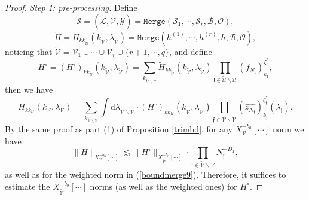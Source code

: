 \documentclass[11 pt,reqno]{amsart}
\theoremstyle{definition}
\theoremstyle{remark}
\numberwithin{equation}{section}
\newcommand{\Sc}{\mathcal{S}}
\newcommand{\Lc}{\mathcal{L}}
\newcommand{\Uc}{\mathcal{U}}
\newcommand{\Vc}{\mathcal{V}}
\newcommand{\Yc}{\mathcal{Y}}
\newcommand{\ff}{\mathfrak{f}}
\newcommand{\lf}{\mathfrak{l}}
\newcommand{\Bs}{\mathscr{B}}
\newcommand{\Os}{\mathscr{O}}
\begin{document}
{\begin{proof}
\emph{Step 1: pre-processing.} Define \[\widetilde{\Sc}=(\widetilde{\Lc},\widetilde{\Vc},\widetilde{\Yc})=\mathtt{Merge}(\Sc_1,\cdots,\Sc_r,\Bs,\Os),\]\[\widetilde{H}=\widetilde{H}_{kk_{\widetilde{\Uc}}}(k_{\widetilde{\Vc}},\lambda_{\widetilde{\Vc}})=\mathtt{Merge}(h^{(1)},\cdots, h^{(r)},h,\Bs,\Os),\] noticing that $\widetilde{\Vc}=\Vc_1\cup\cdots\cup\Vc_r\cup\{r+1,\cdots,q\}$, and define
\begin{equation}\label{prop5.4:H0}
H^\circ=(H^\circ)_{kk_\Uc}(k_{\widetilde{\Vc}},\lambda_{\widetilde{\Vc}})=\sum_{k_{\widetilde{\Uc}\backslash\Uc}}\widetilde{H}_{kk_{\widetilde{\Uc}}}(k_{\widetilde{\Vc}},\lambda_{\widetilde{\Vc}})\prod_{\lf\in \widetilde{\Uc}\backslash\Uc}(f_{N_\lf})_{k_\lf}^{\zeta_\lf^*},\end{equation} then we have
\[H_{kk_\Uc}(k_\Vc,\lambda_\Vc)=\sum_{k_{\widetilde{\Vc}\backslash\Vc}}\int\mathrm{d}\lambda_{\widetilde{\Vc}\backslash\Vc}\cdot(H^\circ)_{kk_\Uc}(k_{\widetilde{\Vc}},\lambda_{\widetilde{\Vc}})\prod_{\ff\in\widetilde{\Vc}\backslash\Vc}(\widehat{z_{N_\ff}})_{k_\ff}^{\zeta_\ff^*}(\lambda_\ff).\] By the same proof as part (1) of Proposition \ref{trimbd}, for any $X_\Vc^{-b_0}[\cdots]$ norm we have
\begin{equation}\label{gainofv}\|H\|_{X_\Vc^{-b_0}[\cdots]}\lesssim\|H^\circ\|_{X_{\widetilde{\Vc}}^{-b_0}[\cdots]}\cdot\prod_{\ff\in\widetilde{\Vc}\backslash\Vc}N_\ff^{-D_1},\end{equation} as well as for the weighted norm in (\ref{boundmerge9}). Therefore, it suffices to estimate the $X_{\widetilde{\Vc}}^{-b_0}[\cdots]$ norms (as well as the weighted ones) for $H^\circ$. 


\end{proof}}
\end{document}
